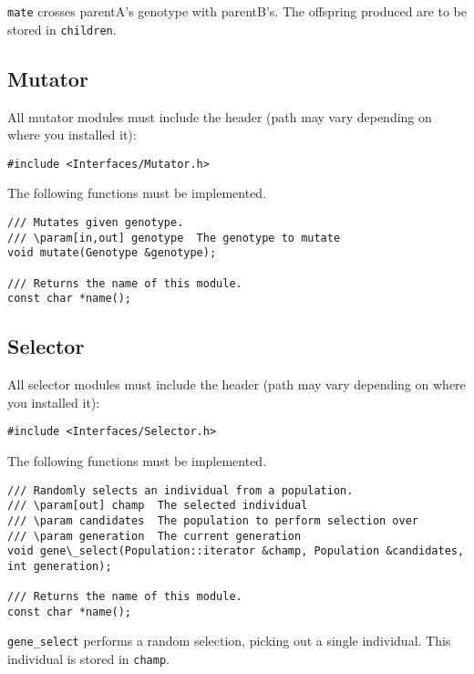 \noindent\texttt{mate} crosses parentA's genotype with parentB's. The offspring produced are to be stored in \texttt{children}.


\subsection{Mutator}

All mutator modules must include the header (path may vary depending on where you installed it):

\begin{verbatim}
#include <Interfaces/Mutator.h>
\end{verbatim}

\noindent The following functions must be implemented.

\begin{verbatim}
/// Mutates given genotype.
/// \param[in,out] genotype  The genotype to mutate
void mutate(Genotype &genotype);

/// Returns the name of this module.
const char *name();
\end{verbatim}


\subsection{Selector}

All selector modules must include the header (path may vary depending on where you installed it):

\begin{verbatim}
#include <Interfaces/Selector.h>
\end{verbatim}

\noindent The following functions must be implemented.

\begin{verbatim}
/// Randomly selects an individual from a population.
/// \param[out] champ  The selected individual
/// \param candidates  The population to perform selection over
/// \param generation  The current generation
void gene\_select(Population::iterator &champ, Population &candidates, int generation);

/// Returns the name of this module.
const char *name();
\end{verbatim}

\noindent\texttt{gene\_select} performs a random selection, picking out a single individual. This individual is stored in \texttt{champ}.
